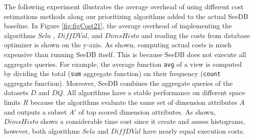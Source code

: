 The following experiment illustrates the average overhead of using different cost estimations methods along our prioritizing algorithms added to the actual SeeDB baseline.
%
In Figure \ref{fig:figCost21}, the average overhead of implementing the algorithms $Sela$ ,  $Diff DVal$, and $DimsHisto$ and reading the costs from database optimizer is shown on the y-axis.
%
As shown, computing actual costs is much expensive than running SeeDB itself.
%
This is because SeeDB does not execute all aggregate queries. 
%
For example, the average function \texttt{avg} of a view is computed by dividing the total (\texttt{sum} aggregate function) on their frequency (\texttt{count} aggregate function). 
%
Moreover, SeeDB combines the aggregate queries of the datasets $D$ and $DQ$. 
%
All algorithms have a stable performance on different space limits $R$ because the algorithms evaluate the same set of dimension attributes $A$ and outputs a subset $A'$ of top scored dimension attributes. 
%
As shown, $DimsHisto$ shows a considerable time cost since it create and assess histograms, however, both algorithms $Sela$ and $Diff DVal$ have nearly equal execution costs.
%
%
  